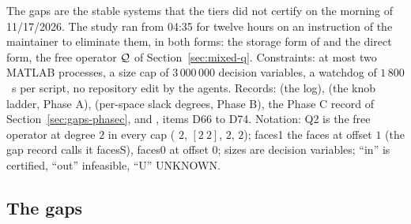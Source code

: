 \begingroup\setlength{\emergencystretch}{8em}
The gaps are the stable systems that the tiers did not certify on the morning of 11/17/2026. The study ran from 04:35 for twelve hours on an instruction of the maintainer to eliminate them, in both forms: the storage form  of  and the direct form, the free operator $\mathcal{Q}$ of Section~\ref{sec:mixed-q}. Constraints: at most two MATLAB processes, a size cap of $3\,000\,000$ decision variables, a watchdog of $1\,800$~s per script, no repository edit by the agents. Records:  (the log),  (the knob ladder, Phase A),  (per-space slack degrees, Phase B), the Phase C record of Section~\ref{sec:gaps-phasec}, and , items D66 to D74. Notation: Q2 is the free operator at degree $2$ in every cap ( $2$,  $[2\ 2]$,  $2$,  $2$); faces1 the faces at offset $1$ (the gap record calls it facesS), faces0 at offset $0$; sizes are decision variables; ``in'' is certified, ``out'' infeasible, ``U'' UNKNOWN.

\subsection{The gaps}\label{sec:gaps-table}

